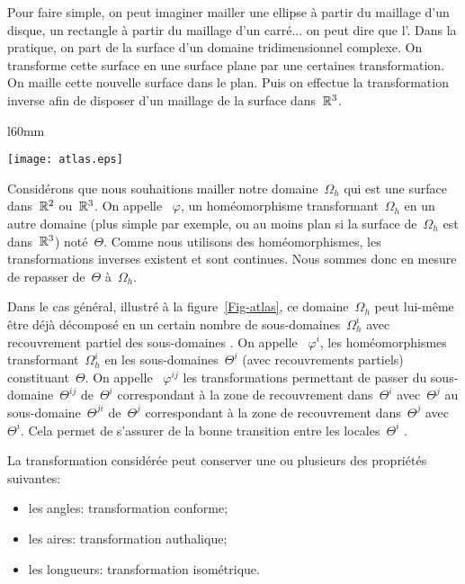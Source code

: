 Pour faire simple, on peut imaginer mailler une ellipse à partir du maillage d'un disque, un rectangle à partir du maillage d'un carré... on peut dire que l'.
Dans la pratique, on part de la surface d'un domaine tridimensionnel complexe. On transforme cette surface en une surface plane par une certaines transformation. On maille cette nouvelle surface dans le plan. Puis on effectue la transformation inverse afin de disposer d'un maillage de la surface dans~$\mathbb R^3$.

\medskip
\begin{wrapfigure}{l}{60mm}
\begin{center}
\texttt{[image: atlas.eps]}
\end{center}
\caption{Domaines et transformations}\label{Fig-atlas}
\end{wrapfigure}
Considérons que nous souhaitions mailler notre domaine~$\Omega_h$ qui est une surface dans~$\mathbb R^2$ ou~$\mathbb R^3$.
On appelle ~$\varphi$, un homéomorphisme transformant~$\Omega_h$ en un autre domaine (plus simple par exemple, ou au moins plan si la surface de~$\Omega_h$ est dans~$\mathbb R^3$) noté~$\Theta$.
Comme nous utilisons des homéomorphismes, les transformations inverses existent et sont continues. Nous sommes donc en mesure de repasser de~$\Theta$ à~$\Omega_h$.

Dans le cas général, illustré à la figure~\ref{Fig-atlas}, ce domaine~$\Omega_h$ peut lui-même être déjà décomposé en un certain nombre de sous-domaines~$\Omega_h^i$ avec recouvrement partiel des sous-domaines .
On appelle ~$\varphi^i$, les homéomorphismes transformant~$\Omega_h^i$ en les sous-domaines~$\Theta^i$ (avec recouvrements partiels) constituant~$\Theta$.
On appelle ~$\varphi^{ij}$ les transformations permettant de passer du sous-domaine~$\Theta^{ij}$ de~$\Theta^i$ correspondant à la zone de recouvrement dans~$\Theta^i$ avec~$\Theta^j$ au sous-domaine~$\Theta^{ji}$ de~$\Theta^j$ correspondant à la zone de recouvrement dans~$\Theta^j$ avec~$\Theta^i$. Cela permet de s'assurer de la bonne transition entre les  locales~$\Theta^{i}$ .

\medskip
La transformation considérée peut conserver une ou plusieurs des propriétés suivantes:
\begin{itemize}
   \item les angles: transformation conforme;
   \item les aires: transformation authalique;
   \item les longueurs: transformation isométrique.
\end{itemize}

